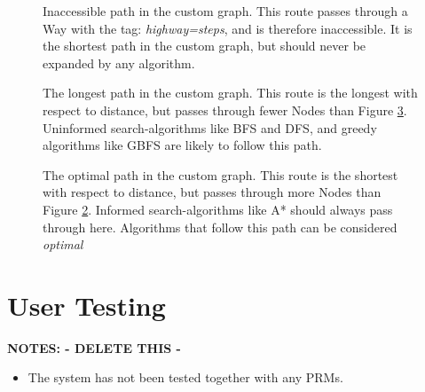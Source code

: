 \begin{figure}
	\centering
	\caption[Inaccessible path in the custom graph]{Inaccessible path in the custom graph. This route passes through a Way with the tag: \textit{highway=steps}, and is therefore inaccessible. It is the shortest path in the custom graph, but should never be expanded by any algorithm.}
	\label{fig:customInaccessible}
\end{figure}

\begin{figure}
	\centering
	\caption[Longest path in the custom graph]{The longest path in the custom graph. This route is the longest with respect to distance, but passes through fewer Nodes than Figure \ref{fig:customShortest}. Uninformed search-algorithms like BFS and DFS, and greedy algorithms like GBFS are likely to follow this path.}
	\label{fig:customLongest}
\end{figure}

\begin{figure}
	\centering
	\caption[Optimal path in the custom graph]{The optimal path in the custom graph. This route is the shortest with respect to distance, but passes through more Nodes than Figure \ref{fig:customLongest}. Informed search-algorithms like A* should always pass through here. Algorithms that follow this path can be considered \textit{optimal}}
	\label{fig:customShortest}
\end{figure}


\section{User Testing}
\textbf{NOTES: - DELETE THIS -}
\begin{itemize}
	\item The system has not been tested together with any PRMs.
\end{itemize}